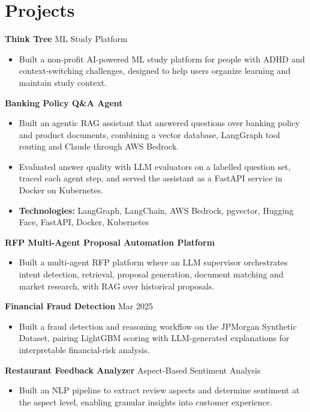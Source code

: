 \documentclass[10pt,a4paper]{article}
\begin{document}
\section{Projects}
\textbf{Think Tree} \textbar{} ML Study Platform\par
\begin{itemize}
  \item Built a non-profit AI-powered ML study platform for people with ADHD and context-switching challenges, designed to help users organize learning and maintain study context.
\end{itemize}
\textbf{Banking Policy Q\&A Agent}\par
\begin{itemize}
  \item Built an agentic RAG assistant that answered questions over banking policy and product documents, combining a vector database, LangGraph tool routing and Claude through AWS Bedrock.
  \item Evaluated answer quality with LLM evaluators on a labelled question set, traced each agent step, and served the assistant as a FastAPI service in Docker on Kubernetes.
  \item \textbf{Technologies:} LangGraph, LangChain, AWS Bedrock, pgvector, Hugging Face, FastAPI, Docker, Kubernetes
\end{itemize}
\textbf{RFP Multi-Agent Proposal Automation Platform}\par
\begin{itemize}
  \item Built a multi-agent RFP platform where an LLM supervisor orchestrates intent detection, retrieval, proposal generation, document matching and market research, with RAG over historical proposals.
\end{itemize}
\textbf{Financial Fraud Detection} \textbar{} Mar 2025\par
\begin{itemize}
  \item Built a fraud detection and reasoning workflow on the JPMorgan Synthetic Dataset, pairing LightGBM scoring with LLM-generated explanations for interpretable financial-risk analysis.
\end{itemize}
\textbf{Restaurant Feedback Analyzer} \textbar{} Aspect-Based Sentiment Analysis\par
\begin{itemize}
  \item Built an NLP pipeline to extract review aspects and determine sentiment at the aspect level, enabling granular insights into customer experience.
\end{itemize}
\end{document}
